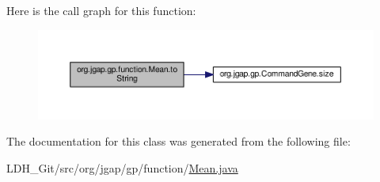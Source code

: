 Here is the call graph for this function\-:
\nopagebreak
\begin{figure}[H]
\begin{center}
\leavevmode
\includegraphics[width=350pt]{classorg_1_1jgap_1_1gp_1_1function_1_1_mean_a77e51439c41cf81799ef2c33fe4c8658_cgraph}
\end{center}
\end{figure}




The documentation for this class was generated from the following file\-:\begin{DoxyCompactItemize}
\item 
L\-D\-H\-\_\-\-Git/src/org/jgap/gp/function/\hyperlink{_mean_8java}{Mean.\-java}\end{DoxyCompactItemize}
